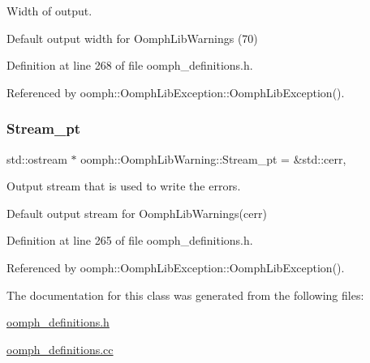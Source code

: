 Width of output. 

Default output width for Oomph\+Lib\+Warnings (70) 

Definition at line 268 of file oomph\+\_\+definitions.\+h.



Referenced by oomph\+::\+Oomph\+Lib\+Exception\+::\+Oomph\+Lib\+Exception().

\mbox{\label{classoomph_1_1OomphLibWarning_a9ef9ec69eb260474537065b7a285717c}} 
\subsubsection{\texorpdfstring{Stream\+\_\+pt}{Stream\_pt}}
{\footnotesize\ttfamily std\+::ostream $\ast$ oomph\+::\+Oomph\+Lib\+Warning\+::\+Stream\+\_\+pt = \&std\+::cerr\hspace{0.3cm}{\ttfamily [static]}, {\ttfamily [private]}}



Output stream that is used to write the errors. 

Default output stream for Oomph\+Lib\+Warnings(cerr) 

Definition at line 265 of file oomph\+\_\+definitions.\+h.



Referenced by oomph\+::\+Oomph\+Lib\+Exception\+::\+Oomph\+Lib\+Exception().



The documentation for this class was generated from the following files\+:\begin{DoxyCompactItemize}
\item 
\hyperlink{oomph__definitions_8h}{oomph\+\_\+definitions.\+h}\item 
\hyperlink{oomph__definitions_8cc}{oomph\+\_\+definitions.\+cc}\end{DoxyCompactItemize}
